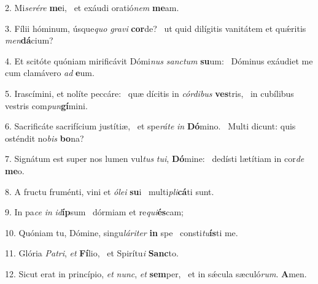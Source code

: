 2. Mi\textit{se}\textit{ré}\textit{re} \textbf{me}i, \ast\  et exáudi oratió\textit{nem} \textbf{me}am.\

3. Fílii hóminum, úsque\textit{quo} \textit{gra}\textit{vi} \textbf{cor}de? \ast\  ut quid dilígitis vanitátem et quǽritis \textit{men}\textbf{dá}cium?\

4. Et scitóte quóniam mirificávit Dómi\textit{nus} \textit{sanc}\textit{tum} \textbf{su}um: \ast\  Dóminus exáudiet me cum clamávero \textit{ad} \textbf{e}um.\

5. Irascímini, et nolíte peccáre: \dag\  quæ dícitis in \textit{cór}\textit{di}\textit{bus} \textbf{ves}tris, \ast\  in cubílibus vestris com\textit{pun}\textbf{gí}mini.\

6. Sacrificáte sacrifícium justítiæ, \dag\  et spe\textit{rá}\textit{te} \textit{in} \textbf{Dó}mino. \ast\  Multi dicunt: quis osténdit no\textit{bis} \textbf{bo}na?\

7. Signátum est super nos lumen vul\textit{tus} \textit{tu}\textit{i}, \textbf{Dó}mine: \ast\  dedísti lætítiam in cor\textit{de} \textbf{me}o.\

8. A fructu fruménti, vini et \textit{ó}\textit{le}\textit{i} \textbf{su}i \ast\  multi\textit{pli}\textbf{cá}ti sunt.\

9. In pa\textit{ce} \textit{in} \textit{id}\textbf{íp}sum \ast\  dórmiam et re\textit{qui}\textbf{és}cam;\

10. Quóniam tu, Dómine, singu\textit{lá}\textit{ri}\textit{ter} \textbf{in} spe \ast\  consti\textit{tu}\textbf{ís}ti me.\

11. Glória \textit{Pa}\textit{tri}, \textit{et} \textbf{Fí}lio, \ast\  et Spirítu\textit{i} \textbf{Sanc}to.\

12. Sicut erat in princípio, \textit{et} \textit{nunc}, \textit{et} \textbf{sem}per, \ast\  et in sǽcula sæculó\textit{rum}. \textbf{A}men.\

